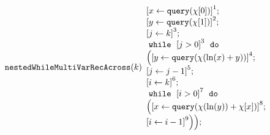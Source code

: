                         \begin{example}
                            \[
                            \kw{nestedWhileMultiVarRecAcross}(k)
                            \begin{array}{l}
                                \clabel{ \assign{x}{\query(\chi[0])}}^{1} ; \\
                                \clabel{ \assign{y}{\query(\chi[1])}}^{2} ; \\
                                \clabel{\assign{j}{k} }^{3} ; \\
                                    \ewhile ~ \clabel{j > 0}^{3} ~ \edo ~ \\
                                    \Big(
                                     \clabel{\assign{y}{\query(\chi(\ln(x) + y))} }^{4}  ; \\
                                     \clabel{\assign{j}{j-1}}^{5} ;\\
                                     \clabel{\assign{i}{k}}^{6} ;\\
                                     \ewhile ~ \clabel{i > 0}^{7} ~ \edo ~ \\
                                     \Big(
                                      \clabel{\assign{x}{\query(\chi(\ln(y))+\chi[x])} }^{8}  ; \\
                                      \clabel{\assign{i}{i-1}}^{9}
                                      \Big) \Big);
                                \end{array}
                            \]
                            \end{example}
                        
